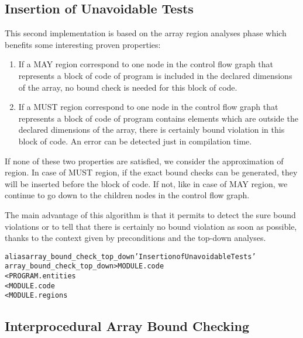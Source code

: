 \documentclass[a4paper]{report}
\newenvironment{PipsMake}{\begin{alltt}}{\end{alltt}}
\newenvironment{PipsPass}[1]{\label{pass:#1}}{}
\begin{document}
\subsection{Insertion of Unavoidable Tests}
\label{subsection-array-bound-check_top_down}

\begin{PipsPass}{array_bound_check_top_down}
This second implementation is based on the array region analyses phase which benefits some interesting proven properties:

\begin{enumerate}

\item If a MAY region correspond to one node in the control flow graph
  that represents a block of code of program is included in the
  declared dimensions of the array, no bound check is needed for this
  block of code.

\item If a MUST region correspond to one node in the control
  flow graph that represents a block of code of program contains elements
  which are outside the declared dimensions of the  array, there is
  certainly bound violation in this block of code. An error can be
  detected just in compilation time.

\end{enumerate}

If none of these two properties are satisfied, we consider the
approximation of region. In case of MUST region, if the exact bound checks
can be generated, they will be inserted before the block of code. If not,
like in case of MAY region, we continue to go down to the children nodes
in the control flow graph.

 The main advantage
of this algorithm is that it permits to detect the sure bound violations
or to tell that there is certainly no bound violation as soon as
possible, thanks to the context given by preconditions and the top-down
analyses.
\end{PipsPass}

\begin{PipsMake}
alias array_bound_check_top_down 'Insertion of Unavoidable Tests'
array_bound_check_top_down   > MODULE.code
        < PROGRAM.entities
        < MODULE.code
        < MODULE.regions
\end{PipsMake}


\subsection{Interprocedural Array Bound Checking}
\label{subsection-array-bound-check_interprocedural}
\end{document}
